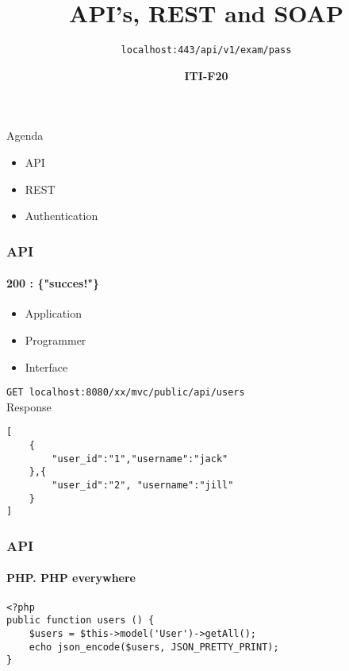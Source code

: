 \documentclass[aspectratio=169,10pt,t]{beamer}
\title{API's, REST and SOAP}
\subtitle{ \texttt{localhost:443/api/v1/exam/pass} }
\date{ }
\author{
  \textbf{ITI-F20}
}
\institute[
  SDU Robotics\\
  The Maersk Mc-Kinney Moller Institute\\
  University of Southern Denmark
] %
{%
  SDU Robotics\\
  The Maersk Mc-Kinney Moller Institute\\
  University of Southern Denmark

}
\begin{document}
{\SDUwavesbg%
\begin{frame} %
  \titlepage
\end{frame}}

\begin{frame}{Agenda}{\vphantom{(y}}
\begin{itemize}
		\item API
		\item REST
		\item Authentication
	\end{itemize}
\end{frame}


\begin{frame}[fragile]
	\frametitle{API}
	\framesubtitle{200 : \{"succes!"\}}
	\begin{itemize}
		\item Application
		\item Programmer
		\item Interface
	\end{itemize}

	\vfill
	\texttt{GET localhost:8080/xx/mvc/public/api/users}\\
	Response
	\begin{verbatim}
[
	{
		"user_id":"1","username":"jack"
	},{
		"user_id":"2", "username":"jill"
	}
]	
	\end{verbatim}
\end{frame}

\begin{frame}[fragile]
	\frametitle{API}
	\framesubtitle{PHP. PHP everywhere}
	\begin{verbatim}
<?php
public function users () {
	$users = $this->model('User')->getAll();
	echo json_encode($users, JSON_PRETTY_PRINT);
}
	\end{verbatim}
\end{frame}
\end{document}
